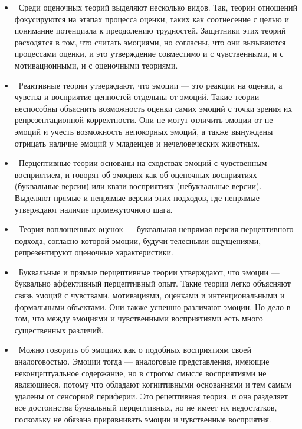 \documentclass[11pt]{book}
\begin{document}
\begin{itemize}
  \item\ Среди оценочных теорий выделяют несколько видов. Так, теории отношений фокусируются на этапах процесса оценки, таких как соотнесение с целью и понимание потенциала к преодолению трудностей. Защитники этих теорий расходятся в том, что считать эмоциями, но согласны, что они вызываются процессами оценки, и это утверждение совместимо и с чувственными, и с мотивационными, и с оценочными теориями.
  \item\ Реактивные теории утверждают, что эмоции --- это реакции на оценки, а чувства и восприятие ценностей отдельны от эмоций. Такие теории неспособны объяснить возможность оценки самих эмоций с точки зрения их репрезентационной корректности. Они не могут отличить эмоции от не-эмоций и учесть возможность непокорных эмоций, а также вынуждены отрицать наличие эмоций у младенцев и нечеловеческих животных.
  \item\ Перцептивные теории основаны на сходствах эмоций с чувственным восприятием, и говорят об эмоциях как об оценочных восприятиях (буквальные версии) или квази-восприятиях (небуквальные версии). Выделяют прямые и непрямые версии этих подходов, где непрямые утверждают наличие промежуточного шага.
  \item\ Теория воплощенных оценок --- буквальная непрямая версия перцептивного подхода, согласно которой эмоции, будучи телесными ощущениями, репрезентируют оценочные характеристики.
  \item\ Буквальные и прямые перцептивные теории утверждают, что эмоции --- буквально аффективный перцептивный опыт. Такие теории легко объясняют связь эмоций с чувствами, мотивациями, оценками и интенциональными и формальными объектами. Они также успешно различают эмоции. Но дело в том, что между эмоциями и чувственными восприятиями есть много существенных различий.
  \item\ Можно говорить об эмоциях как о подобных восприятиям своей аналоговостью. Эмоции тогда --- аналоговые представления, имеющие неконцептуальное содержание, но в строгом смысле восприятиями не являющиеся, потому что обладают когнитивными основаниями и тем самым удалены от сенсорной периферии. Это рецептивная теория, и она разделяет все достоинства буквальный перцептивных, но не имеет их недостатков, поскольку не обязана приравнивать эмоции и чувственные восприятия.
\end{itemize}
\end{document}
